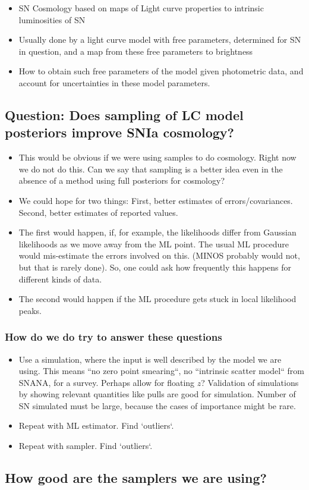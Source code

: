 
\begin{itemize}
\item SN Cosmology based on maps of Light curve properties to intrinsic luminosities of SN
\item Usually done by a light curve model with free parameters, determined for SN in question, and a map from these free parameters to brightness  
\item How to obtain such free parameters of the model given photometric data, and account for uncertainties in these model parameters.
\end{itemize}

\subsection{Question: Does sampling of LC model posteriors improve SNIa cosmology?}

\begin{itemize}
\item  This would be obvious if we were using samples to do cosmology. Right
now we do not do this. Can we say that sampling is a better idea even in the 
absence of a method using full posteriors for cosmology?
\item We could hope for two things: First, better estimates of errors/covariances. Second, better estimates of reported values.
\item The first would happen, if, for example, the likelihoods differ from 
Gaussian likelihoods as we move away from the ML point. The usual ML procedure
would mis-estimate the errors involved on this. (MINOS probably would not, but
that is rarely done). So, one could ask how frequently this happens for
different kinds of data. 
\item The second would happen if the ML procedure gets stuck in local 
likelihood peaks. 
\end{itemize}

\subsubsection{How do we do try to answer these questions}
\begin{itemize}
\item Use a simulation, where the input is well described by the model we are 
using. This means ``no zero point smearing``, no ``intrinsic scatter model`` 
from SNANA, for a survey. Perhaps allow for floating $z$? Validation of simulations by showing relevant quantities like pulls 
are good for simulation. Number of SN simulated must be large, because the cases of importance might be rare.
\item Repeat with ML estimator.  Find `outliers`. 
\item Repeat with sampler. Find `outliers`. 
\end{itemize}

\subsection{How good are the samplers we are using?}

